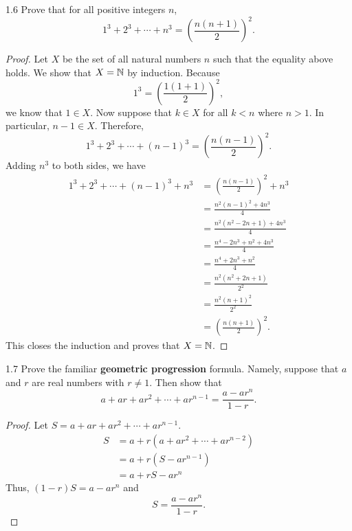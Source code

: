 \begin{exercise}{1.6}
    Prove that for all positive integers \(n\),
    \[1^3 + 2^3 + \cdots + n^3 = \left(\frac{n(n+1)}{2}\right)^2.\]
\end{exercise}
\begin{proof}
    Let \(X\) be the set of all natural numbers \(n\) such that the equality above holds.
    We show that \(X = \mathbb{N}\) by induction. Because \[1^3 = \left(\frac{1(1+1)}{2}\right)^2,\]
    we know that \(1 \in X\). Now suppose that \(k \in X\) for all \(k < n\) where \(n > 1\). In particular, \(n-1 \in X\).
    Therefore, \[1^3 + 2^3 + \cdots + (n-1)^3 = \left(\frac{n(n-1)}{2}\right)^2.\]
    Adding \(n^3\) to both sides, we have
    \begin{align*}
        1^3 + 2^3 + \cdots + (n-1)^3 + n^3 &= \left(\frac{n(n-1)}{2}\right)^2 + n^3\\
        &= \frac{n^2(n-1)^2 + 4n^3}{4} \\
        &= \frac{n^2(n^2 - 2n + 1) + 4n^3}{4} \\
        &= \frac{n^4 - 2n^3 + n^2 + 4n^3}{4} \\
        &= \frac{n^4 + 2n^3 + n^2}{4} \\
        &= \frac{n^2(n^2 + 2n + 1)}{2^2} \\
        &= \frac{n^2(n+1)^2}{2^2} \\
        &= \left(\frac{n(n+1)}{2}\right)^2.
    \end{align*}
    This closes the induction and proves that \(X = \mathbb{N}\).
\end{proof}

\begin{exercise}{1.7}
    Prove the familiar \textbf{geometric progression} formula. Namely, suppose that \(a\) and \(r\)
    are real numbers with \(r \neq 1\). Then show that \[a + ar + ar^2 + \cdots + ar^{n-1} = \frac{a - ar^n}{1-r}.\]
\end{exercise}
\begin{proof}
    Let \(S = a + ar + ar^2 + \cdots + ar^{n-1}\).
    \begin{align*}
        S &= a + r(a + ar^2 + \cdots + ar^{n-2}) \\
        &= a + r(S - ar^{n-1})\\
        &= a + rS - ar^n
    \end{align*}
    Thus, \((1-r)S = a - ar^n\) and \[S = \frac{a-ar^n}{1-r}.\]
\end{proof}


